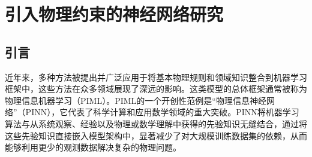 \section{引入物理约束的神经网络研究}
\subsection{引言}
近年来，多种方法被提出并广泛应用于将基本物理规则和领域知识整合到机器学习框架中，这些方法在众多领域展现了深远的影响。这类模型的总体框架通常被称为物理信息机器学习（PIML）。PIML的一个开创性范例是“物理信息神经网络”（PINN），它代表了科学计算和应用数学领域的重大突破\cite{karniadakisPhysicsinformedMachineLearning2021,raissiPhysicsinformedNeuralNetworks2019}。PINN将机器学习算法与从系统观察、经验以及物理或数学理解中获得的先验知识无缝结合，通过将这些先验知识直接嵌入模型架构中，显著减少了对大规模训练数据集的依赖，从而能够利用更少的观测数据解决复杂的物理问题。

